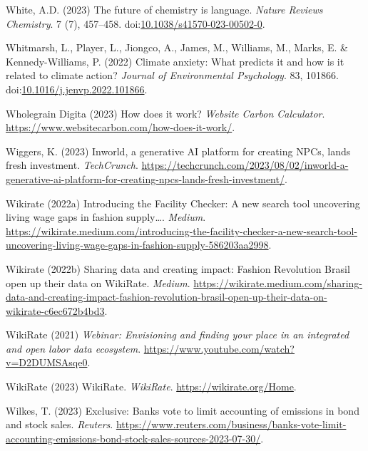 \documentclass[
  letterpaper,
  DIV=11,
  numbers=noendperiod]{scrartcl}
\newlength{\cslhangindent}
\newenvironment{CSLReferences}[2] %
 {\begin{list}{}{%
  \setlength{\itemindent}{0pt}
  \setlength{\leftmargin}{0pt}
  \setlength{\parsep}{0pt}
  \ifodd #1
   \setlength{\leftmargin}{\cslhangindent}
   \setlength{\itemindent}{-1\cslhangindent}
  \fi
  \setlength{\itemsep}{#2\baselineskip}}}
 {\end{list}}
\begin{document}
\begin{CSLReferences}{0}{1}
White, A.D. (2023) The future of chemistry is language. \emph{Nature
Reviews Chemistry}. 7 (7), 457--458.
doi:\href{https://doi.org/10.1038/s41570-023-00502-0}{10.1038/s41570-023-00502-0}.

Whitmarsh, L., Player, L., Jiongco, A., James, M., Williams, M., Marks,
E. \& Kennedy-Williams, P. (2022) Climate anxiety: {What} predicts it
and how is it related to climate action? \emph{Journal of Environmental
Psychology}. 83, 101866.
doi:\href{https://doi.org/10.1016/j.jenvp.2022.101866}{10.1016/j.jenvp.2022.101866}.

Wholegrain Digita (2023) How does it work? \emph{Website Carbon
Calculator}. \url{https://www.websitecarbon.com/how-does-it-work/}.

Wiggers, K. (2023) Inworld, a generative {AI} platform for creating
{NPCs}, lands fresh investment. \emph{TechCrunch}.
\url{https://techcrunch.com/2023/08/02/inworld-a-generative-ai-platform-for-creating-npcs-lands-fresh-investment/}.

Wikirate (2022a) Introducing the {Facility Checker}: {A} new search tool
uncovering living wage gaps in fashion supply{\ldots{}}. \emph{Medium}.
\url{https://wikirate.medium.com/introducing-the-facility-checker-a-new-search-tool-uncovering-living-wage-gaps-in-fashion-supply-586203aa2998}.

Wikirate (2022b) Sharing data and creating impact: {Fashion Revolution
Brasil} open up their data on {WikiRate}. \emph{Medium}.
\url{https://wikirate.medium.com/sharing-data-and-creating-impact-fashion-revolution-brasil-open-up-their-data-on-wikirate-c6ec672b4bd3}.

WikiRate (2021) \emph{Webinar: {Envisioning} and finding your place in
an integrated and open labor data ecosystem}.
\url{https://www.youtube.com/watch?v=D2DUMSAsqe0}.

WikiRate (2023) {WikiRate}. \emph{WikiRate}.
\url{https://wikirate.org/Home}.

Wilkes, T. (2023) Exclusive: {Banks} vote to limit accounting of
emissions in bond and stock sales. \emph{Reuters}.
\url{https://www.reuters.com/business/banks-vote-limit-accounting-emissions-bond-stock-sales-sources-2023-07-30/}.


\end{CSLReferences}
\end{document}
